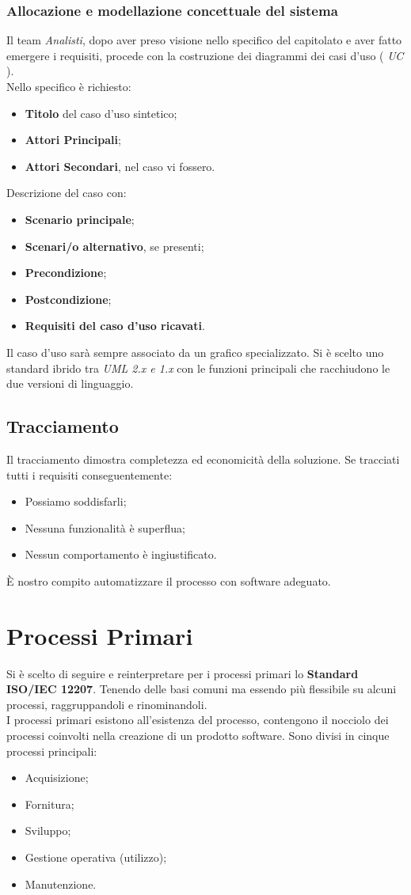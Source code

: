 \documentclass[12pt,a4paper,titlepage]{article}
\begin{document}
\subsubsection{Allocazione e modellazione concettuale del sistema}
Il team \textit{Analisti}, dopo aver preso visione nello specifico del capitolato e aver fatto emergere i requisiti, procede con la costruzione dei diagrammi dei casi d'uso ( \textit{UC} ).\\
Nello specifico è richiesto:
\begin{itemize}
	\item \textbf{Titolo} del caso d'uso sintetico;
	\item \textbf{Attori Principali};
	\item \textbf{Attori Secondari}, nel caso vi fossero.
\end{itemize}
Descrizione del caso con:
\begin{itemize}
	\item \textbf{Scenario principale};
	\item \textbf{Scenari/o alternativo}, se presenti;
	\item \textbf{Precondizione};
	\item \textbf{Postcondizione};
	\item \textbf{Requisiti del caso d'uso ricavati}.
\end{itemize}
Il caso d'uso sarà sempre associato da un grafico specializzato. Si è scelto uno standard ibrido tra \textit{UML 2.x e 1.x} con le funzioni principali che racchiudono le due versioni di linguaggio.
\subsection{Tracciamento}
Il tracciamento dimostra completezza ed economicità della soluzione. Se tracciati tutti i requisiti conseguentemente:
\begin{itemize}
	\item Possiamo soddisfarli;
	\item Nessuna funzionalità è superflua;
	\item Nessun comportamento è ingiustificato.
\end{itemize}
È nostro compito automatizzare il processo con software adeguato.
\newpage
{}
\section{Processi Primari}
Si è scelto di seguire e reinterpretare per i processi primari lo \textbf{Standard ISO/IEC 12207}. Tenendo delle basi comuni ma essendo più flessibile su alcuni processi, raggruppandoli e rinominandoli.\\
I processi primari esistono all'esistenza del processo, contengono il nocciolo dei processi coinvolti nella creazione di un prodotto software. Sono divisi in cinque processi principali:
\begin{itemize}
	\item Acquisizione;
	\item Fornitura;
	\item Sviluppo;
	\item Gestione operativa (utilizzo);
	\item Manutenzione.
\end{itemize}
\end{document}
